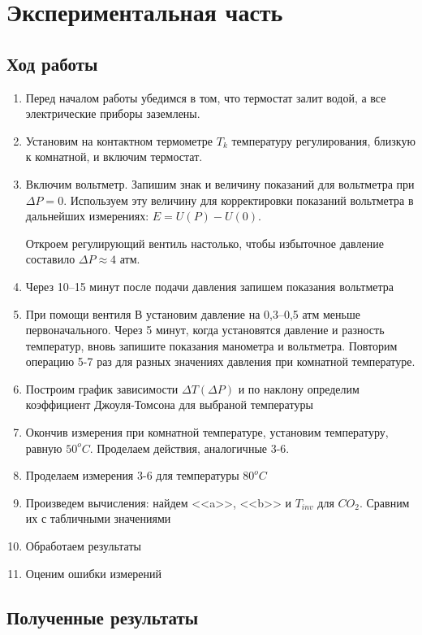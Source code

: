 \documentclass[a4paper,12pt]{article} %
\begin{document}
\section{Экспериментальная часть}
\subsection{Ход работы}
\begin{enumerate} 
\itemsep0em
\item Перед началом работы убедимся в том, что термостат залит водой,
а все электрические приборы заземлены.
\item Установим на контактном термометре $T_k$ температуру регулирования, близкую к комнатной, и включим термостат. 
\item Включим вольтметр. Запишим знак и величину показаний для вольтметра при $\Delta P = 0$. Используем эту величину для корректировки показаний вольтметра в дальнейших измерениях: $E = U(P)-U(0)$.

Откроем регулирующий вентиль настолько, чтобы избыточное давление составило $\Delta P \approx 4$ атм.
\item Через 10–15 минут после подачи давления запишем показания вольтметра
\item При помощи вентиля В установим давление на 0,3–0,5 атм меньше первоначального. Через 5 минут, когда
установятся давление и разность температур, вновь запишите показания манометра и вольтметра. Повторим операцию 5-7 раз для разных значениях давления при комнатной температуре.
\item Построим график зависимости $\Delta T (\Delta P)$ и по наклону определим коэффициент Джоуля-Томсона для выбраной температуры
\item Окончив измерения при комнатной температуре, установим температуру, равную $50 ^oC$. Проделаем действия, аналогичные 3-6. 
\item Проделаем измерения 3-6 для температуры $80 ^oC$
\item Произведем вычисления: найдем <<a>>, <<b>> и $T_{inv}$ для $CO_2$. Сравним их с табличными значениями
\item Обработаем результаты
\item Оценим ошибки измерений 

\end{enumerate}
\subsection{Полученные результаты}
\end{document}
